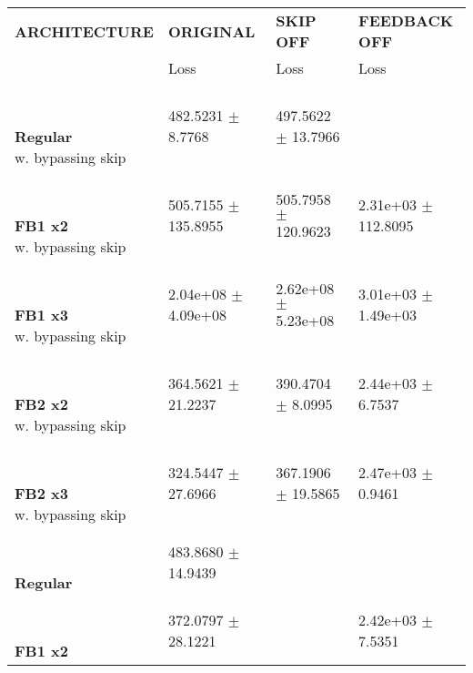 
\begin{table}[ht]
    \centering
    \begin{tabular}{|>{\columncolor{gray!05}}l|l|l|l|}
        \hline
        \rowcolor{white}
        \textbf{\footnotesize ARCHITECTURE} & \textbf{\footnotesize ORIGINAL} & \textbf{\footnotesize SKIP OFF} & \textbf{\footnotesize FEEDBACK OFF} \\

        \rowcolor{white}
        & {\footnotesize Loss} & {\footnotesize Loss} & {\footnotesize Loss} \\
        \hline
\shortstack[l]{\\ {} \\ \textbf{Regular}\\{w. bypassing skip}} & 482.5231 $\pm$ 8.7768 & 497.5622 $\pm$ 13.7966 &  \\
 \hline 
\shortstack[l]{\\ {} \\ \textbf{FB1 x2}\\{w. bypassing skip}} & 505.7155 $\pm$ 135.8955 & 505.7958 $\pm$ 120.9623 & 2.31e+03 $\pm$ 112.8095 \\
 \hline 
\shortstack[l]{\\ {} \\ \textbf{FB1 x3}\\{w. bypassing skip}} & 2.04e+08 $\pm$ 4.09e+08 & 2.62e+08 $\pm$ 5.23e+08 & 3.01e+03 $\pm$ 1.49e+03 \\
 \hline 
\shortstack[l]{\\ {} \\ \textbf{FB2 x2}\\{w. bypassing skip}} & 364.5621 $\pm$ 21.2237 & 390.4704 $\pm$ 8.0995 & 2.44e+03 $\pm$ 6.7537 \\
 \hline 
\shortstack[l]{\\ {} \\ \textbf{FB2 x3}\\{w. bypassing skip}} & 324.5447 $\pm$ 27.6966 & 367.1906 $\pm$ 19.5865 & 2.47e+03 $\pm$ 0.9461 \\
 \hline 
\shortstack[l]{\\ {} \\ \textbf{Regular}\\{}} & 483.8680 $\pm$ 14.9439 &  &  \\
 \hline 
\shortstack[l]{\\ {} \\ \textbf{FB1 x2}\\{}} & 372.0797 $\pm$ 28.1221 &  & 2.42e+03 $\pm$ 7.5351 \\

\end{tabular}
\end{table}
